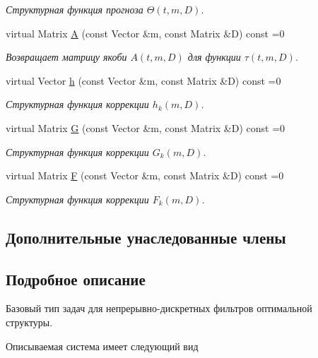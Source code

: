 \begin{DoxyCompactItemize}
\begin{DoxyCompactList}\small\item\em Структурная функция прогноза $\Theta(t,m,D)$. \end{DoxyCompactList}\item 
virtual Matrix \hyperlink{class_core_1_1_continuous_discrete_task_a332d99b61aabb919bffe75d0eec05cfe}{A} (const Vector \&m, const Matrix \&D) const =0
\begin{DoxyCompactList}\small\item\em Возвращает матрицу якоби $A(t, m, D)$ для функции $\tau(t, m, D)$. \end{DoxyCompactList}\item 
virtual Vector \hyperlink{class_core_1_1_continuous_discrete_task_a25e88b71eb477d99bad66a66c982af6f}{h} (const Vector \&m, const Matrix \&D) const =0
\begin{DoxyCompactList}\small\item\em Структурная функция коррекции $h_k(m, D)$. \end{DoxyCompactList}\item 
virtual Matrix \hyperlink{class_core_1_1_continuous_discrete_task_a2bc6d34d112ec0999857f7f9e0f67dda}{G} (const Vector \&m, const Matrix \&D) const =0
\begin{DoxyCompactList}\small\item\em Структурная функция коррекции $G_k(m, D)$. \end{DoxyCompactList}\item 
virtual Matrix \hyperlink{class_core_1_1_continuous_discrete_task_a08947ea4d4eb819e0e8530e682a1a377}{F} (const Vector \&m, const Matrix \&D) const =0
\begin{DoxyCompactList}\small\item\em Структурная функция коррекции $F_k(m, D)$. \end{DoxyCompactList}\end{DoxyCompactItemize}
\subsection*{Дополнительные унаследованные члены}


\subsection{Подробное описание}
Базовый тип задач для непрерывно-\/дискретных фильтров оптимальной структуры. 

Описываемая система имеет следующий вид


